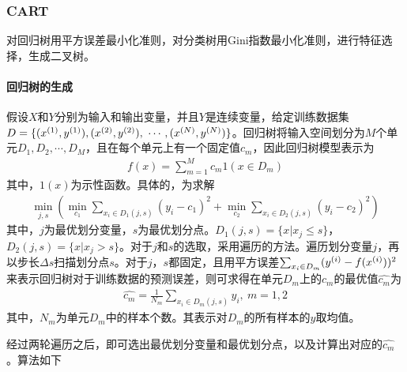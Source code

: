 \subsubsection{CART}
对回归树用平方误差最小化准则，对分类树用Gini指数最小化准则，进行特征选择，生成二叉树。

\paragraph{回归树的生成}

假设$X$和$Y$分别为输入和输出变量，并且$Y$是连续变量，给定训练数据集$ D=\{ ({x}^{({1})},{y}^{({1})}),({x}^{({2})},{y}^{({2})}),$ $\cdots,({x}^{({N})},{y}^{({N})}) \} $。回归树将输入空间划分为$M$个单元$D_1,D_2,\cdots,D_M$，且在每个单元上有一个固定值$c_m$，因此回归树模型表示为
\begin{eqnarray}
f(x)=\sum_{m=1}^M c_m1(x\in D_m)
\end{eqnarray}
其中，$1(x)$为示性函数。具体的，为求解
\begin{eqnarray}
\min_{j,s}
\left(
	\min_{c_1}\sum_{x_i\in D_1(j,s)}(y_i-c_1)^2+\min_{c_2}\sum_{x_i\in D_2(j,s)}(y_i-c_2)^2
\right)
\end{eqnarray}
其中，$j$为最优划分变量，$s$为最优划分点。$D_1(j,s)=\{x|x_j\leq s\}$，$D_2(j,s)=\{x|x_j> s\}$。对于$j$和$s$的选取，采用遍历的方法。遍历划分变量$j$，再以步长$\Delta s$扫描划分点$s$。对于$j$，$s$都固定，且用平方误差$\sum_{x_i\in D_m}({y}^{({i})}-f({x}^{({i})}))^2$来表示回归树对于训练数据的预测误差，则可求得在单元$D_m$上的$c_m$的最优值$\hat{c_m}$为
\begin{eqnarray}
\hat{c_m}=\frac{1}{N_m}\sum_{x_i\in D_m(j,s)}y_i,\ m=1,2
\end{eqnarray}
其中，$N_m$为单元$D_m$中的样本个数。其表示对$D_m$的所有样本的$y$取均值。

经过两轮遍历之后，即可选出最优划分变量和最优划分点，以及计算出对应的$\hat{c_m}$。算法如下

